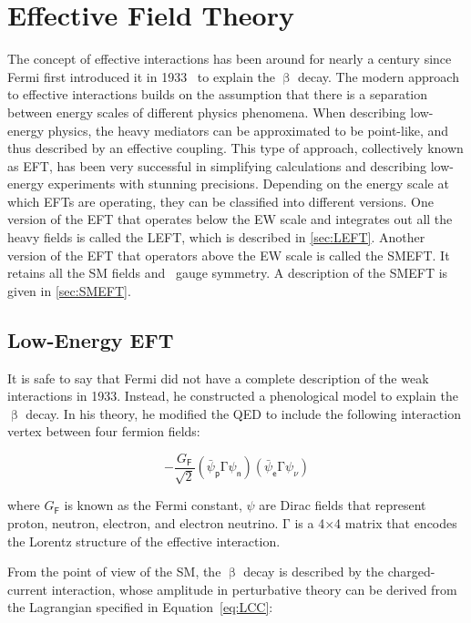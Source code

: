 \chapter{Effective Field Theory}
\label{chap:EFT}

The concept of effective interactions has been around for nearly a century since Fermi first introduced it in 1933~\cite{Fermi:1933jpa} to explain the $\upbeta$ decay. The modern approach to effective interactions builds on the assumption that there is a separation between energy scales of different physics phenomena. When describing low-energy physics, the heavy mediators can be approximated to be point-like, and thus described by an effective coupling. This type of approach, collectively known as \ac{EFT}, has been very successful in simplifying calculations and describing low-energy experiments with stunning precisions. Depending on the energy scale at which \acp{EFT} are operating, they can be classified into different versions. One version of the \ac{EFT} that operates below the \ac{EW} scale and integrates out all the heavy fields is called the \ac{LEFT}, which is described in \autoref{sec:LEFT}. Another version of the \ac{EFT} that operators above the \ac{EW} scale is called the \ac{SMEFT}. It retains all the \ac{SM} fields and \sm~gauge symmetry. A description of the \ac{SMEFT} is given in \autoref{sec:SMEFT}.

\section{Low-Energy EFT}
\label{sec:LEFT}

It is safe to say that Fermi did not have a complete description of the weak interactions in 1933. Instead, he constructed a phenological model to explain the $\upbeta$ decay. In his theory, he modified the \ac{QED} to include the following interaction vertex between four fermion fields:

\begin{equation}
-\frac{G_{\textsf{F}}}{\sqrt{2}}(\bar{\psi}_{\textsf{p}}\mathrm{\Gamma}\psi_{\textsf{n}})(\bar{\psi}_{\textsf{e}}\mathrm{\Gamma}\psi_{\nu})
\end{equation}

where $G_{\textsf{F}}$ is known as the Fermi constant, $\psi$ are Dirac fields that represent proton, neutron, electron, and electron neutrino. $\mathrm{\Gamma}$ is a 4$\times$4 matrix that encodes the Lorentz structure of the effective interaction. 

From the point of view of the \ac{SM}, the $\upbeta$ decay is described by the charged-current interaction, whose amplitude in perturbative theory can be derived from the Lagrangian specified in Equation~\ref{eq:LCC}:

